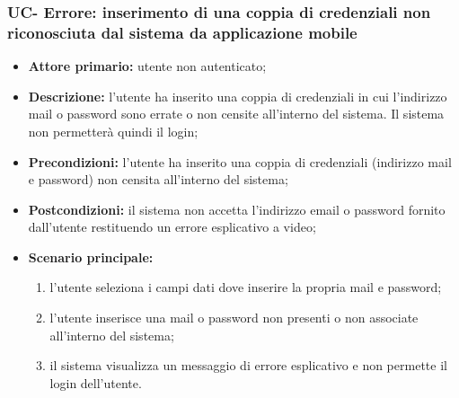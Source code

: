 \subsubsection{UC- Errore: inserimento di una coppia di credenziali non riconosciuta dal sistema da applicazione mobile}
\begin{itemize}
	\item \textbf{Attore primario:} utente non autenticato;

	\item \textbf{Descrizione:} l'utente ha inserito una coppia di credenziali in cui l'indirizzo mail o password sono errate o non censite all'interno del sistema. Il sistema non permetterà quindi il login;
	
	\item \textbf{Precondizioni:} l'utente ha inserito una coppia di credenziali (indirizzo mail e password) non censita all'interno del sistema;

	\item \textbf{Postcondizioni:} il sistema non accetta l'indirizzo email o password fornito dall'utente restituendo un errore esplicativo a video;

	\item \textbf{Scenario principale:}
	      \begin{enumerate}
		      \item l'utente seleziona i campi dati dove inserire la propria mail e password;
		      \item l'utente inserisce una mail o password non presenti o non associate all'interno del sistema;
		      \item il sistema visualizza un messaggio di errore esplicativo e non permette il login dell'utente.
		\end{enumerate}
\end{itemize}


